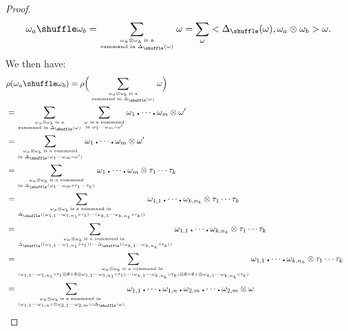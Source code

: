 \documentclass[10pt,a4paper]{article}
\begin{document}
\begin{proof}
$$
	\omega_a \shuffle \omega_b
	= \sum_{\omega_a \otimes \omega_b \text{ is a} \atop \text{summand in } \Delta_{\shuffle}(\omega)} \omega
	= \sum_{\omega} <\Delta_{\shuffle}(\omega), \omega_a \otimes \omega_b> \omega.
$$
We then have:
\begin{align*}
\lefteqn{\rho(\omega_a \shuffle \omega_b)
= \rho\Big(\sum_{\omega_a \otimes \omega_b \text{ is a} \atop \text{summand in } \Delta_{\shuffle}(\omega)} \omega \Big)} \\
&= 
\sum_{\omega_a \otimes \omega_b \text{ is a} \atop \text{summand in } \Delta_{\shuffle}(\omega)} 
\sum_{\omega \text{ is a summand} \atop \text{in } \omega_1 \cdots \omega_m \circ \omega'} \omega_1 \centerdot \cdots \centerdot \omega_m \otimes \omega' \\
&=
\sum_{\omega_a \otimes \omega_b \text{ is a summand} \atop \text{in } \Delta_{\shuffle}(\omega_1 \cdots \omega_m \circ \omega')} \omega_1 \centerdot \cdots \centerdot \omega_m \otimes \omega' \\
&=
\sum_{\omega_a \otimes \omega_b \text{ is a summand}  \atop \text{in } \Delta_{\shuffle}(\omega_1 \cdots \omega_m \circ \tau_1\cdots\tau_k)} \omega_1 \centerdot \dots \centerdot \omega_m \otimes \tau_1\cdots \tau_k \\
&=
\sum_{\omega_a \otimes \omega_b \text{ is a summand in } \atop \Delta_{\shuffle}((\omega_{1,1}\cdots \omega_{1,n_1} \circ \tau_1) \cdots (\omega_{k,1} \cdots \omega_{k,n_k} \circ \tau_k))} \omega_{1,1} \centerdot \cdots \centerdot \omega_{k,n_k} \otimes \tau_1\cdots\tau_k \\
&=
\sum_{\omega_a \otimes \omega_b \text{ is a summand in } \atop \Delta_{\shuffle}((\omega_{1,1}\cdots \omega_{1,n_1} \circ \tau_1)) \cdots \Delta_{\shuffle}((\omega_{k,1} \cdots \omega_{k,n_k} \circ \tau_k))} \omega_{1,1} \centerdot \dots \centerdot \omega_{k,n_k} \otimes \tau_1\cdots\tau_k \\
&=
\sum_{\omega_a \otimes \omega_b \text{ is a summand in } \atop (\omega_{1,1}\cdots \omega_{1,n_1} \circ \tau_1 \otimes \emptyset + \emptyset \otimes \omega_{1,1}\cdots \omega_{1,n_1} \circ \tau_1) \cdots (\omega_{k,1} \cdots \omega_{k,n_k} \circ \tau_k) \otimes \emptyset + \emptyset +\otimes \omega_{k,1} \cdots \omega_{k,n_k} \circ \tau_k)} \omega_{1,1} \centerdot \dots \centerdot \omega_{k,n_k} \otimes \tau_1\cdots\tau_k \\
&=
\sum_{\omega_a \otimes \omega_b \text{ is a summand in } \atop (\omega_{1,1} \cdots \omega_{1,n} \circ \otimes \omega_{2,1} \cdots \omega_{2,m} \circ)\Delta_{\shuffle}(\omega)} \omega_{1,1} \centerdot \cdots \centerdot \omega_{1,n} \centerdot \omega_{2,m} \centerdot \cdots \centerdot \omega_{2,m} \otimes \omega \\

\end{align*}
\end{proof}
\end{document}
